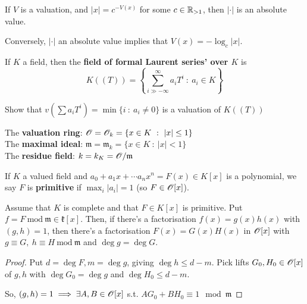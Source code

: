 \documentclass[a4paper]{article}
\begin{document}
{\begin{rem}
	If $V$ is a valuation, and $|x|=c^{-V(x)}$ for some $c\in\mathbb{R}_{>1}$, then $|\cdot|$ is an absolute value.
	
	Conversely, $|\cdot|$ an absolute value implies that $V(x)=-\log_c|x|$.
\end{rem}

\begin{defi}
	If $K$ a field, then the \textbf{field of formal Laurent series' over $K$} is 
	\[
		K((T))=\left\{\sum_{i\gg-\infty}^{\infty}a_iT^i\ :\ a_i\in K\right\}
	\]
\end{defi}

\begin{exer}
	Show that $v\left(\sum a_iT^i\right)=\min\{i\ :\ a_i\neq0\}$ is a valuation of $K((T))$
\end{exer}

\begin{notation}
	The \textbf{valuation ring}: $\mathscr{O}=\mathscr{O}_k=\{x\in K\ :\ |x|\leq 1\}$\\
	The \textbf{maximal ideal}: $\mathfrak{m}=\mathfrak{m}_k=\{x\in K\ :\ |x|< 1\}$\\
	The \textbf{residue field}: $k=k_K=\mathscr{O}/\mathfrak{m}$
\end{notation}

\begin{defi}[Primitive]
	If $K$ a valued field and $a_0+a_1x+\cdots a_nx^n=F(x)\in K[x]$ is a polynomial, we say $F$ is \textbf{primitive} if $\max_i|a_i|=1$ (so $F\in\mathscr{O}[x]$).
\end{defi}

\begin{thm-num}
	Assume that $K$ is complete and that $F\in K[x]$ is primitive. Put $f= F\ \mathrm{mod}\ \mathfrak{m}\in\mathfrak{k}[x]$. Then, if there's a factorisation $f(x)=g(x)h(x)$ with $(g,h)=1$, then there's a factorisation $F(x)=G(x)H(x)$ in $\mathscr{O}[x]$ with $g\equiv G,\ h\equiv H\ \mathrm{mod}\ \mathfrak{m}$ and $\deg g = \deg G$.
\end{thm-num}
\begin{proof}
	Put $d=\deg F, m=\deg g$, giving $\deg h\leq d-m$. Pick lifts $G_0,H_0\in\mathscr{O}[x]$ of $g,h$ with $\deg G_0=\deg g$ and $\deg H_0\leq d-m$.
	
	So, $(g,h)=1\implies\exists A,B\in\mathscr{O}[x]$ s.t. $AG_0+BH_0\equiv1\mod{\mathfrak{m}}$
	

\end{proof}}
\end{document}
